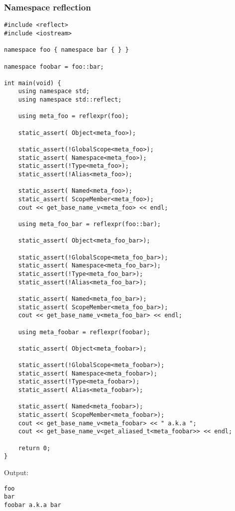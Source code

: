 \subsubsection{Namespace reflection}

\begin{verbatim}
#include <reflect>
#include <iostream>

namespace foo { namespace bar { } }

namespace foobar = foo::bar;

int main(void) {
	using namespace std;
	using namespace std::reflect;

	using meta_foo = reflexpr(foo);

	static_assert( Object<meta_foo>);

	static_assert(!GlobalScope<meta_foo>);
	static_assert( Namespace<meta_foo>);
	static_assert(!Type<meta_foo>);
	static_assert(!Alias<meta_foo>);

	static_assert( Named<meta_foo>);
	static_assert( ScopeMember<meta_foo>);
	cout << get_base_name_v<meta_foo> << endl;

	using meta_foo_bar = reflexpr(foo::bar);

	static_assert( Object<meta_foo_bar>);

	static_assert(!GlobalScope<meta_foo_bar>);
	static_assert( Namespace<meta_foo_bar>);
	static_assert(!Type<meta_foo_bar>);
	static_assert(!Alias<meta_foo_bar>);

	static_assert( Named<meta_foo_bar>);
	static_assert( ScopeMember<meta_foo_bar>);
	cout << get_base_name_v<meta_foo_bar> << endl;

	using meta_foobar = reflexpr(foobar);

	static_assert( Object<meta_foobar>);

	static_assert(!GlobalScope<meta_foobar>);
	static_assert( Namespace<meta_foobar>);
	static_assert(!Type<meta_foobar>);
	static_assert( Alias<meta_foobar>);

	static_assert( Named<meta_foobar>);
	static_assert( ScopeMember<meta_foobar>);
	cout << get_base_name_v<meta_foobar> << " a.k.a ";
	cout << get_base_name_v<get_aliased_t<meta_foobar>> << endl;

	return 0;
}
\end{verbatim}

Output:

\begin{verbatim}
foo
bar
foobar a.k.a bar
\end{verbatim}

